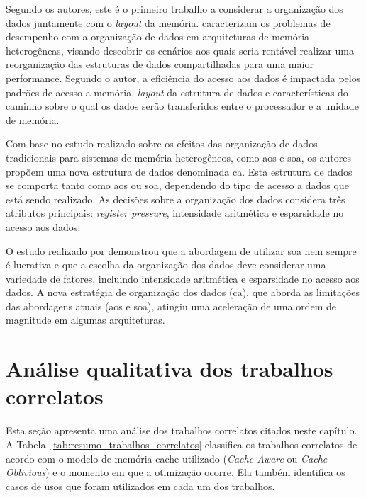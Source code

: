 Segundo os autores, este é o primeiro trabalho a considerar a organização dos dados juntamente com o \textit{layout} da memória.
 caracterizam os problemas de desempenho com a organização de dados em arquiteturas de memória heterogêneas, visando descobrir os cenários aos quais seria rentável realizar uma reorganização das estruturas de dados compartilhadas para uma maior performance.
Segundo o autor, a eficiência do acesso aos dados é impactada pelos padrões de acesso a memória, \textit{layout} da estrutura de dados e características do caminho sobre o qual os dados serão transferidos entre o processador e a unidade de memória.

Com base no estudo realizado sobre os efeitos das organização de dados tradicionais para sistemas de memória heterogêneos, como \ac{aos} e \ac{soa}, os autores propõem uma nova estrutura de dados denominada \ac{ca}.
Esta estrutura de dados se comporta tanto como \ac{aos} ou \ac{soa}, dependendo do tipo de acesso a dados que está sendo realizado.
As decisões sobre a organização dos dados considera três atributos principais: \textit{register pressure}, intensidade aritmética e esparsidade no acesso aos dados.

O estudo realizado por  demonstrou que a abordagem de utilizar \ac{soa} nem sempre é lucrativa e que a escolha da organização dos dados deve considerar uma variedade de fatores, incluindo intensidade aritmética e esparsidade no acesso aos dados.
A nova estratégia de organização dos dados (\ac{ca}), que aborda as limitações das abordagens atuais (\ac{aos} e \ac{soa}), atingiu uma aceleração de uma ordem de magnitude em algumas arquiteturas.

\section{Análise qualitativa dos trabalhos correlatos}
\label{sec:analise_trabalhos_correlatos}

Esta seção apresenta uma análise dos trabalhos correlatos citados neste capítulo.
A Tabela~\ref{tab:resumo_trabalhos_correlatos} classifica os trabalhos correlatos de acordo com o modelo de memória cache utilizado (\textit{Cache-Aware} ou \textit{Cache-Oblivious}) e o momento em que a otimização ocorre.
Ela também identifica os casos de usos que foram utilizados em cada um dos trabalhos.


